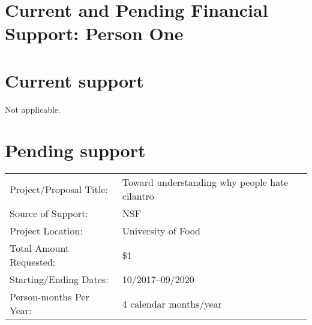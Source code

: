 \section*{Current and Pending Financial Support: Person One}


\section*{Current support}
Not applicable.

\section*{Pending support}
\begin{tabular}{p{} p{}}
\hline
Project/Proposal Title:	& Toward understanding why people hate cilantro\\
Source of Support: 	& NSF\\
Project Location: 	& University of Food\\
Total Amount Requested: & \$1\\
Starting/Ending Dates: 	& 10/2017--09/2020\\
Person-months Per Year: & 4 calendar months/year\\
\hline
\end{tabular}
